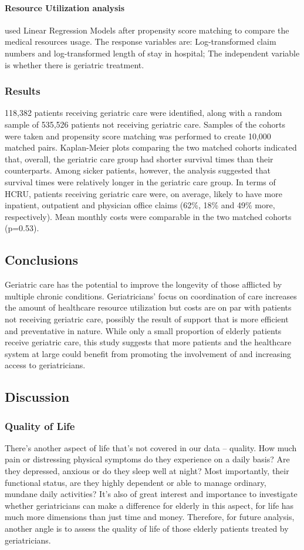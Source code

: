 \documentclass{article}
\begin{document}
	\paragraph{Resource Utilization analysis} used Linear Regression Models after propensity score matching to compare the medical resources usage. The response variables are: Log-transformed claim numbers and log-transformed length of stay in hospital; The independent variable is whether there is geriatric treatment.
	
	\subsubsection{Results}
	118,382 patients receiving geriatric care were identified, along with a random sample of 535,526 patients not receiving geriatric care. Samples of the cohorts were taken and propensity score matching was performed to create 10,000 matched pairs. Kaplan-Meier plots comparing the two matched cohorts indicated that, overall, the geriatric care group had shorter survival times than their counterparts. Among sicker patients, however, the analysis suggested that survival times were relatively longer in the geriatric care group. In terms of HCRU, patients receiving geriatric care were, on average, likely to have more inpatient, outpatient and physician office claims (62\%, 18\% and 49\% more, respectively). Mean monthly costs were comparable in the two matched cohorts (p=0.53).
	
	
	\subsection{Conclusions}
	Geriatric care has the potential to improve the longevity of those afflicted by multiple chronic conditions. Geriatricians’ focus on coordination of care increases the amount of healthcare resource utilization but costs are on par with patients not receiving geriatric care, possibly the result of support that is more efficient and preventative in nature. While only a small proportion of elderly patients receive geriatric care, this study suggests that more patients and the healthcare system at large could benefit from promoting the involvement of and increasing access to geriatricians.
	\subsection{Discussion}
	\subsubsection{Quality of Life}
	There’s another aspect of life that’s not covered in our data – quality. How much pain or distressing physical symptoms do they experience on a daily basis? Are they depressed, anxious or do they sleep well at night? Most importantly, their functional status, are they highly dependent or able to manage ordinary, mundane daily activities? It’s also of great interest and importance to investigate whether geriatricians can make a difference for elderly in this aspect, for life has much more dimensions than just time and money. Therefore, for future analysis, another angle is to assess the quality of life of those elderly patients treated by geriatricians.
\end{document}
